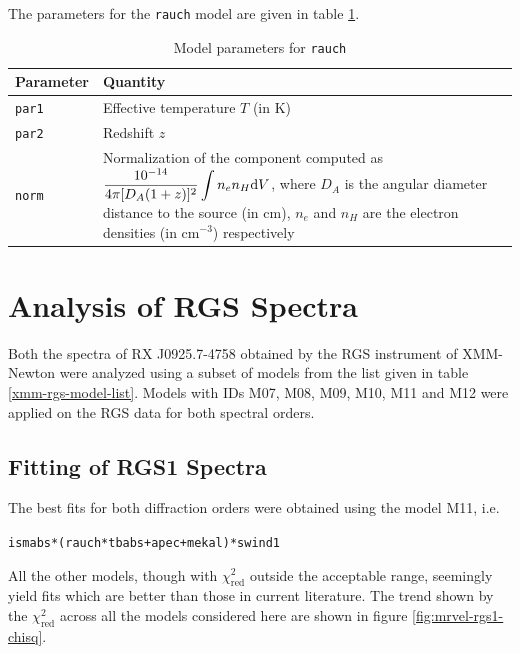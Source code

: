 				The parameters for the \texttt{rauch} model are given in table \ref{param:rauch}.
				\begin{table}[h!]
					\centering
					\caption{Model parameters for \texttt{rauch}}
					\label{param:rauch}
					\begin{tabular}{|p{3cm}|p{10cm}|}
						\hline
						\textbf{Parameter} & \textbf{Quantity} \\ \hline
						{\texttt{par1}} & {Effective temperature $T$ (in K)} \\ \hline
						{\texttt{par2}} & {Redshift $z$} \\ \hline
						{\texttt{norm}} & {Normalization of the component computed as $\displaystyle\dfrac{10^{-14}}{4\pi[D_A(1+z)]^2}\int{n_en_H\mathrm{d}V}$, where $D_A$ is the angular diameter distance to the source (in cm), $n_e$ and $n_H$ are the electron densities (in cm$^{-3}$) respectively} \\ \hline
					\end{tabular}
				\end{table}
	
	\section{Analysis of RGS Spectra} \label{hi-resolution:analysis}
		Both the spectra of RX J0925.7-4758 obtained by the RGS instrument of XMM-Newton were analyzed using a subset of models from the list given in table \ref{xmm-rgs-model-list}. Models with IDs M07, M08, M09, M10, M11 and M12 were applied on the RGS data for both spectral orders.
		
		\subsection{Fitting of RGS1 Spectra} \label{hi-resolution:analysis:rgs1}
			The best fits for both diffraction orders were obtained using the model M11, i.e.
			\begin{center}
				\texttt{ismabs*(rauch*tbabs+apec+mekal)*swind1}
			\end{center}
			All the other models, though with $\chi^2_\text{red}$ outside the acceptable range, seemingly yield fits which are better than those in current literature. The trend shown by the $\chi^2_\text{red}$ across all the models considered here are shown in figure \ref{fig:mrvel-rgs1-chisq}.
			
